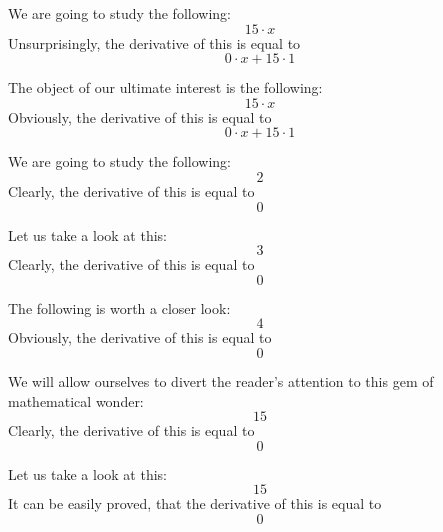 \documentclass{article}
\begin{document}
We are going to study the following:
\begin{equation}
15 \cdot x 
\end{equation}
Unsurprisingly, the derivative of this is equal to
\begin{equation}
0 \cdot x + 15 \cdot 1 
\end{equation}

The object of our ultimate interest is the following:
\begin{equation}
15 \cdot x 
\end{equation}
Obviously, the derivative of this is equal to
\begin{equation}
0 \cdot x + 15 \cdot 1 
\end{equation}

We are going to study the following:
\begin{equation}
2 
\end{equation}
Clearly, the derivative of this is equal to
\begin{equation}
0 
\end{equation}

Let us take a look at this:
\begin{equation}
3 
\end{equation}
Clearly, the derivative of this is equal to
\begin{equation}
0 
\end{equation}

The following is worth a closer look:
\begin{equation}
4 
\end{equation}
Obviously, the derivative of this is equal to
\begin{equation}
0 
\end{equation}

We will allow ourselves to divert the reader's attention to this gem of mathematical wonder:
\begin{equation}
15 
\end{equation}
Clearly, the derivative of this is equal to
\begin{equation}
0 
\end{equation}

Let us take a look at this:
\begin{equation}
15 
\end{equation}
It can be easily proved, that the derivative of this is equal to
\begin{equation}
0 
\end{equation}
\end{document}
